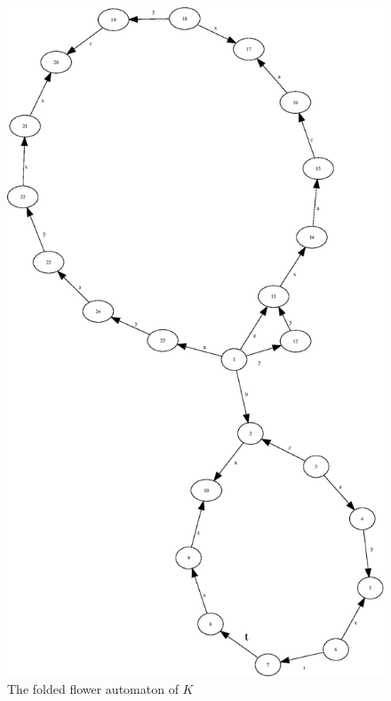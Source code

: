 \documentclass[a4paper,12pt]{article}
\numberwithin{equation}{section}
\numberwithin{figure}{section}
\begin{document}
\begin{figure}
\begin{center}
\includegraphics[scale=0.5,bb=0 0 820 720]{python/ex_K_folded.eps}
\caption{The folded flower automaton of $K$}
\label{fig:Kflower}
\end{center}
\end{figure}
\end{document}
